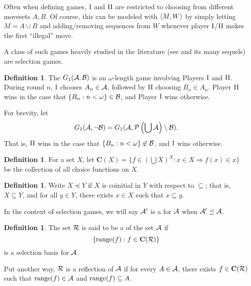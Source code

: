 \documentclass{amsart}
\theoremstyle{plain}
\theoremstyle{definition}
\newtheorem{definition}[theorem]{Definition}
\theoremstyle{remark}
\theoremstyle{plain}
\theoremstyle{definition}
\theoremstyle{remark}
\begin{document}
Often when defining games, \(\mathrm{I}\) and \(\mathrm{II}\) are restricted to choosing
from different movesets \(A,B\). Of course, this can be modeled with \(\langle M,W\rangle\)
by simply letting \(M=A\cup B\) and adding/removing sequences from \(W\)
whenever player \(\mathrm{I}\)/\(\mathrm{II}\) makes the first ``illegal'' move.

A class of such games heavily studied in the literature (see \cite{MR1378387} and its
many sequels) are selection games.

\begin{definition}
  The  \(G_{1}(\mathcal{A},\mathcal{B})\) 
  is an \(\omega\)-length game involving Players \(\mathrm{I}\) and \(\mathrm{II}\). 
  During round \(n\), \(\mathrm{I}\) chooses
  \(A_n\in\mathcal{A}\), followed by \(\mathrm{II}\) choosing \(B_n\in A_n\).
  Player \(\mathrm{II}\) wins in the case that \(\{B_n:n<\omega\}\in\mathcal{B}\),
  and Player \(\mathrm{I}\) wins otherwise.
\end{definition}

  For brevity, let 
  \[
    G_{1}(\mathcal{A},\neg \mathcal{B})
      =
    G_{1}(\mathcal{A},\mathcal{P}\left(\bigcup \mathcal{A}\right)\setminus \mathcal{B})
  .\]
  That is, \(\mathrm{II}\) wins in the case that \(\{B_n:n<\omega\}\not\in\mathcal{B}\),
  and \(\mathrm{I}\) wins otherwise.

\begin{definition}
  For a set \(X\), let \(\mathbf C(X)=\{f\in(\bigcup X)^X:x\in X\Rightarrow f(x)\in x\}\)
  be the collection of all choice functions on \(X\).
\end{definition}

\begin{definition}
  Write \(X\preceq Y\) if \(X\) is coinitial in \(Y\) with respect to \(\subseteq\);
  that is, \(X\subseteq Y\), and for all \(y\in Y\), there exists \(x\in X\) such that 
  \(x\subseteq y\).

  In the context of selection games, we will say \(\mathcal{A}'\) is a 
  for \(\mathcal{A}\) when \(\mathcal{A}'\preceq \mathcal{A}\).
\end{definition}

\begin{definition}
  The set \(\mathcal{R}\) is said to be a  of the set \(\mathcal{A}\)
  if \[\{\text{range}(f):f\in\mathbf C(\mathcal{R})\}\] is a selection basis for \(\mathcal{A}\).
\end{definition}

Put another way, \(\mathcal{R}\) is a reflection of \(\mathcal{A}\) if for every \(A\in\mathcal{A}\),
there exists \(f\in\mathbf C(\mathcal{R})\) such that \(\text{range}(f)\in\mathcal{A}\) and \(\text{range}(f)\subseteq A\).
\end{document}
